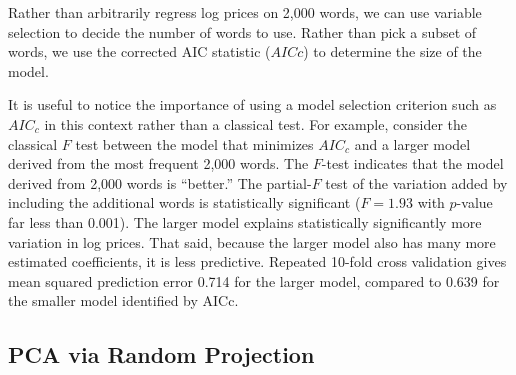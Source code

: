 \documentclass[10pt]{article}
\begin{document}
Rather than arbitrarily regress log prices on 2,000 words, we can use variable selection to decide the number of words to use.  Rather than pick a subset of words, we use the corrected AIC statistic ($AICc$) to determine the size of the model.  

It is useful to notice the importance of using a model selection criterion such as $AIC_c$ in this context rather than a classical test.  For example, consider the classical $F$ test between the  model that minimizes $AIC_c$ and a larger model derived from the most frequent 2,000 words.  The $F$-test indicates that the model derived from 2,000 words is ``better.''  The  partial-$F$ test of the variation added by including the additional words is statistically significant ($F = 1.93$ with $p$-value far less than 0.001).  The larger model explains statistically significantly more variation in log prices.  That said, because the larger model also has many more estimated coefficients, it is less predictive.  Repeated 10-fold cross validation gives mean squared prediction error 0.714 for the larger model, compared to 0.639 for the smaller model identified by AICc.



   



 \subsection{ PCA  via Random Projection }  %
\end{document}
